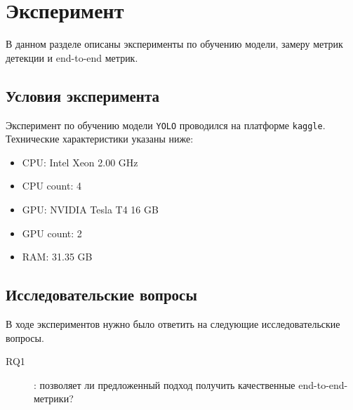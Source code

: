 
\section{Эксперимент}
\label{sec:experiment}

В данном разделе описаны эксперименты по обучению модели, замеру метрик детекции и
end-to-end метрик.

\subsection{Условия эксперимента}

Эксперимент по обучению модели \texttt{YOLO} проводился на платформе \texttt{kaggle}.
Технические характеристики указаны ниже:
\begin{itemize}
    \item CPU: Intel Xeon 2.00 GHz
    \item CPU count: 4
    \item GPU: NVIDIA Tesla T4 16 GB
    \item GPU count: 2
    \item RAM: 31.35 GB
\end{itemize}

\subsection{Исследовательские вопросы}

В ходе экспериментов нужно было ответить на следующие исследовательские вопросы.

\begin{description}
    \item[RQ1]: позволяет ли предложенный подход получить качественные end-to-end-метрики?
\end{description}

